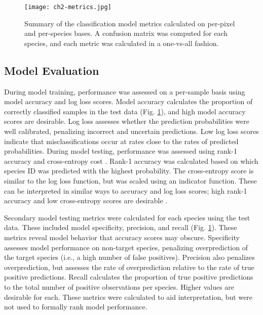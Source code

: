 \begin{figure}[!ht]
\texttt{[image: ch2-metrics.jpg]}
\centering
\caption[Summary of the classification model metrics calculated on per-pixel and per-species bases.]{Summary of the classification model metrics calculated on per-pixel and per-species bases. A confusion matrix was computed for each species, and each metric was calculated in a one-vs-all fashion.}
\label{fig:metrics}
\end{figure}

\subsection{Model Evaluation}

During model training, performance was assessed on a per-sample basis using model accuracy and log loss scores. Model accuracy calculates the proportion of correctly classified samples in the test data (Fig. \ref{fig:metrics}), and high model accuracy scores are desirable. Log loss assesses whether the prediction probabilities were well calibrated, penalizing incorrect and uncertain predictions. Low log loss scores indicate that misclassifications occur at rates close to the rates of predicted probabilities. During model testing, performance was assessed using rank-1 accuracy and cross-entropy cost \cite{Marconi2018-wn}. Rank-1 accuracy was calculated based on which species ID was predicted with the highest probability. The cross-entropy score is similar to the log loss function, but was scaled using an indicator function. These can be interpreted in similar ways to accuracy and log loss scores; high rank-1 accuracy and low cross-entropy scores are desirable \cite{Hastie2009-fs}.

Secondary model testing metrics were calculated for each species using the test data. These included model specificity, precision, and recall (Fig. \ref{fig:metrics}). These metrics reveal model behavior that accuracy scores may obscure. Specificity assesses model performance on non-target species, penalizing overprediction of the target species (i.e., a high number of false positives). Precision also penalizes overprediction, but assesses the rate of overprediction relative to the rate of true positive predictions. Recall calculates the proportion of true positive predictions to the total number of positive observations per species. Higher values are desirable for each. These metrics were calculated to aid interpretation, but were not used to formally rank model performance.

